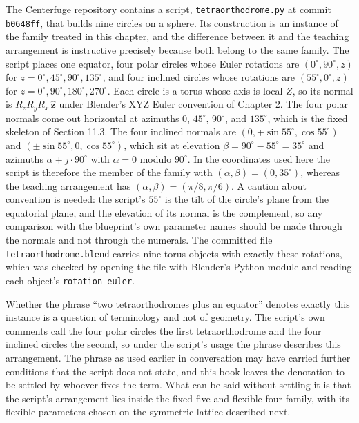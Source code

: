 The Centerfuge repository contains a script, \texttt{tetraorthodrome.py} at commit \texttt{b0648ff}, that builds nine circles on a sphere. Its construction is an instance of the family treated in this chapter, and the difference between it and the teaching arrangement is instructive precisely because both belong to the same family. The script places one equator, four polar circles whose Euler rotations are $(0^\circ,90^\circ,z)$ for $z=0^\circ,45^\circ,90^\circ,135^\circ$, and four inclined circles whose rotations are $(55^\circ,0^\circ,z)$ for $z=0^\circ,90^\circ,180^\circ,270^\circ$. Each circle is a torus whose axis is local $Z$, so its normal is $R_zR_yR_x\,\hat{\mathbf z}$ under Blender's XYZ Euler convention of Chapter 2. The four polar normals come out horizontal at azimuths $0$, $45^\circ$, $90^\circ$, and $135^\circ$, which is the fixed skeleton of Section 11.3. The four inclined normals are $(0,\mp\sin55^\circ,\cos55^\circ)$ and $(\pm\sin55^\circ,0,\cos55^\circ)$, which sit at elevation $\beta=90^\circ-55^\circ=35^\circ$ and azimuths $\alpha+j\cdot90^\circ$ with $\alpha=0$ modulo $90^\circ$. In the coordinates used here the script is therefore the member of the family with $(\alpha,\beta)=(0,35^\circ)$, whereas the teaching arrangement has $(\alpha,\beta)=(\pi/8,\pi/6)$. A caution about convention is needed: the script's $55^\circ$ is the tilt of the circle's plane from the equatorial plane, and the elevation of its normal is the complement, so any comparison with the blueprint's own parameter names should be made through the normals and not through the numerals. The committed file \texttt{tetraorthodrome.blend} carries nine torus objects with exactly these rotations, which was checked by opening the file with Blender's Python module and reading each object's \texttt{rotation\_euler}.

Whether the phrase ``two tetraorthodromes plus an equator'' denotes exactly this instance is a question of terminology and not of geometry. The script's own comments call the four polar circles the first tetraorthodrome and the four inclined circles the second, so under the script's usage the phrase describes this arrangement. The phrase as used earlier in conversation may have carried further conditions that the script does not state, and this book leaves the denotation to be settled by whoever fixes the term. What can be said without settling it is that the script's arrangement lies inside the fixed-five and flexible-four family, with its flexible parameters chosen on the symmetric lattice described next.

